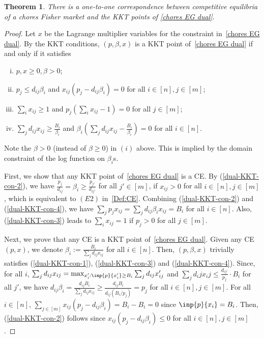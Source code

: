 \documentclass[format=acmsmall,authorversion]{acmart}
\newtheorem{theorem}{Theorem}
\begin{document}
\begin{theorem}
    There is a one-to-one correspondence between competitive equilibria of a chores Fisher market and the KKT points of \ref{chores EG dual}.
    \label{thm:dual EG kkt correspondence}
\end{theorem}
\begin{proof}
    Let $x$ be the Lagrange multiplier variables for the constraint in~\ref{chores EG dual}. 
    By the KKT conditions, $(p, \beta, x)$ is a KKT point of~\ref{chores EG dual} if and only if it satisfies 
    \begin{enumerate}[(i)]
        \item $p, x \geq 0, \beta > 0$; %
        \label{dual-KKT-con-1}
        \item $p_j \leq d_{ij} \beta_i$ and $x_{ij} \left( p_j - d_{ij} \beta_i \right) = 0$ for all $i \in [n], j \in [m]$; \label{dual-KKT-con-2}
        \item $\sum_i x_{ij} \geq 1$ and $p_j \left( \sum_i x_{ij} - 1 \right) = 0$ for all $j \in [m]$; \label{dual-KKT-con-3}
        \item $\sum_j d_{ij} x_{ij} \geq \frac{B_i}{\beta_i}$ and $\beta_i \left( \sum_j d_{ij} x_{ij} - \frac{B_i}{\beta_i} \right) = 0$ for all $i \in [n]$.\label{dual-KKT-con-4}
    \end{enumerate}
    Note the $\beta >0$ (instead of $\beta \ge 0$) in $(i)$ above. This is implied by the domain constraint of the log function on $\beta_i$s. 
    
    First, we show that any KKT point of~\ref{chores EG dual} is a CE. By (\cref{dual-KKT-con-2}), we have $\frac{p_j}{d_{ij}} = \beta_i \geq \frac{p_{j'}}{d_{ij'}}$ for all $j' \in [m]$, if $x_{ij} > 0$ for all $i \in [n], j \in [m]$, which is equivalent to $(E2)$ in~\cref{Def:CE}. Combining (\cref{dual-KKT-con-2}) and (\cref{dual-KKT-con-4}), we have $\sum_j p_j x_{ij} = \sum_j d_{ij} \beta_i x_{ij} = B_i$ for all $i \in [n]$. Also, (\cref{dual-KKT-con-3}) leads to $\sum_i x_{ij} = 1$ if $p_j > 0$ for all $j \in [m]$.

    Next, we prove that any CE is a KKT point of~\ref{chores EG dual}. Given any CE $(p, x)$, we denote $\beta_i := \frac{B_i}{\sum_j d_{ij} x_{ij}}$ for all $i \in [n]$. Then, $(p, \beta, x)$ trivially satisfies (\cref{dual-KKT-con-1}), (\cref{dual-KKT-con-3}) and (\cref{dual-KKT-con-4}). Since, for all $i$, $\sum_j d_{ij} x_{ij} = \max_{x'_i: \inp{p}{x'_i} \geq B_i} \sum_j d_{ij} x'_{ij}$ and $\sum_j d_ij x_ij \le \frac{d_{ij'}}{p_j} \cdot B_i$ for all $j'$, we have $d_{ij} \beta_i = \frac{d_{ij} B_i}{\sum_j d_{ij} x_{ij}} \geq \frac{d_{ij} B_i}{d_{ij} ({B_i} / {p_j}) } = p_j$ for all $i \in [n], j \in [m]$. For all $i \in [n]$, $\sum_{j \in [m]} x_{ij} \left( p_j - d_{ij} \beta_i \right) = B_i - B_i = 0$ since $\inp{p}{x_i} = B_i$. Then, (\cref{dual-KKT-con-2}) follows since $x_{ij} \left( p_j - d_{ij} \beta_i \right) \leq 0$ for all $i \in [n], j \in [m]$.
\end{proof}
\end{document}
